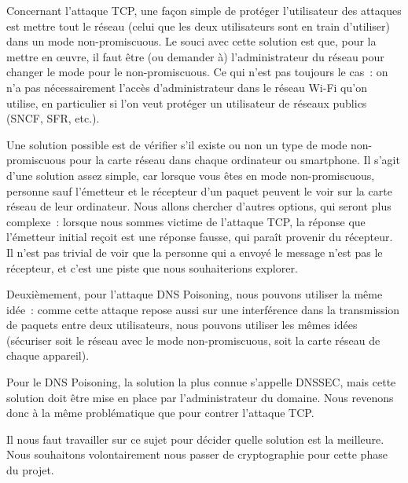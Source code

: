 \documentclass[a4paper, 12pt,twoside]{article}
\begin{document}
    Concernant l'attaque TCP, une façon simple de protéger l'utilisateur des attaques est mettre tout le réseau (celui que les deux utilisateurs sont en train d'utiliser) dans un mode non-promiscuous. Le souci avec cette solution est que, pour la mettre en \oe{}uvre, il faut être (ou demander à) l'administrateur du réseau pour changer le mode pour le non-promiscuous. Ce qui n'est pas toujours le cas~: on n'a pas nécessairement l'accès d'administrateur dans le réseau Wi-Fi qu'on utilise, en particulier si l'on veut protéger un utilisateur de réseaux publics (SNCF, SFR, etc.).

    Une solution possible est de vérifier s'il existe ou non un type de mode non-promiscuous pour la carte réseau dans chaque ordinateur ou smartphone. Il s'agit d'une solution assez simple, car lorsque vous êtes en mode non-promiscuous, personne sauf l'émetteur et le récepteur d'un paquet peuvent le voir sur la carte réseau de leur ordinateur. Nous allons chercher d'autres options, qui seront plus complexe~:  lorsque nous sommes victime de l'attaque TCP, la réponse que l'émetteur initial reçoit est une réponse fausse, qui paraît provenir du récepteur. Il n'est pas trivial de voir que la personne qui a envoyé le message n'est pas le récepteur, et c'est une piste que nous souhaiterions explorer.

    Deuxièmement, pour l'attaque DNS Poisoning, nous pouvons utiliser la même idée~: comme cette attaque repose aussi sur une interférence dans la transmission de paquets entre deux utilisateurs, nous pouvons utiliser les mêmes idées (sécuriser soit le réseau avec le mode non-promiscuous, soit la carte réseau de chaque appareil).

    Pour le DNS Poisoning, la solution la plus connue s'appelle DNSSEC, mais cette solution doit être mise en place par l'administrateur du domaine. Nous revenons donc à la même problématique que pour contrer l'attaque TCP.

    Il nous faut travailler sur ce sujet pour décider quelle solution est la meilleure. Nous souhaitons volontairement nous passer de cryptographie pour cette phase du projet.


\end{document}
